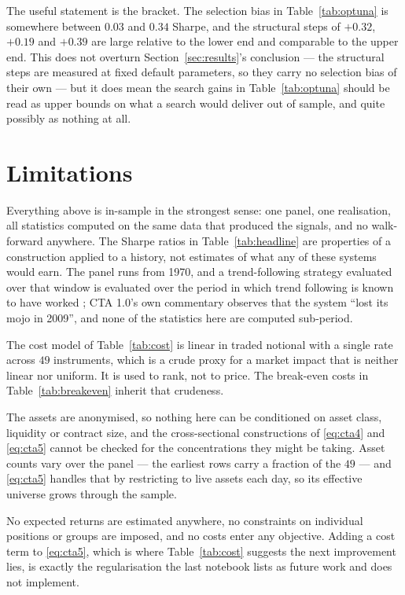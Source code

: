 \documentclass[11pt,a4paper]{article}
\begin{document}
The useful statement is the bracket. The selection bias in
Table~\ref{tab:optuna} is somewhere between $0.03$ and $0.34$ Sharpe, and the
structural steps of $+0.32$, $+0.19$ and $+0.39$ are large relative to the
lower end and comparable to the upper end. This does not overturn
Section~\ref{sec:results}'s conclusion --- the structural steps are measured
at fixed default parameters, so they carry no selection bias of their own ---
but it does mean the search gains in Table~\ref{tab:optuna} should be read as
upper bounds on what a search would deliver out of sample, and quite possibly
as nothing at all.

\section{Limitations}

Everything above is in-sample in the strongest sense: one panel, one
realisation, all statistics computed on the same data that produced the
signals, and no walk-forward anywhere. The Sharpe ratios in
Table~\ref{tab:headline} are properties of a construction applied to a
history, not estimates of what any of these systems would earn. The panel runs
from 1970, and a trend-following strategy evaluated over that window is
evaluated over the period in which trend following is known to have worked
\citep{hurst2017}; CTA 1.0's own commentary observes that the system ``lost
its mojo in 2009'', and none of the statistics here are computed
sub-period.

The cost model of Table~\ref{tab:cost} is linear in traded notional with a
single rate across $49$ instruments, which is a crude proxy for a market
impact that is neither linear nor uniform. It is used to rank, not to price.
The break-even costs in Table~\ref{tab:breakeven} inherit that crudeness.

The assets are anonymised, so nothing here can be conditioned on asset class,
liquidity or contract size, and the cross-sectional constructions of
\eqref{eq:cta4} and \eqref{eq:cta5} cannot be checked for the concentrations
they might be taking. Asset counts vary over the panel --- the earliest rows
carry a fraction of the $49$ --- and \eqref{eq:cta5} handles that by
restricting to live assets each day, so its effective universe grows through
the sample.

No expected returns are estimated anywhere, no constraints on individual
positions or groups are imposed, and no costs enter any objective. Adding a
cost term to \eqref{eq:cta5}, which is where Table~\ref{tab:cost} suggests the
next improvement lies, is exactly the regularisation the last notebook lists
as future work and does not implement.
\end{document}
